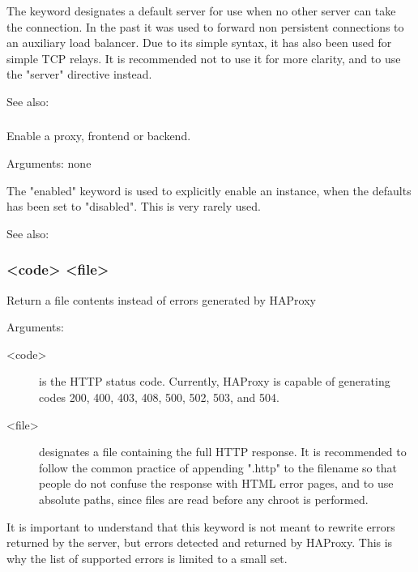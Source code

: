  The  keyword designates a default server for use when no other
  server can take the connection. In the past it was used to forward non
  persistent connections to an auxiliary load balancer. Due to its simple
  syntax, it has also been used for simple TCP relays. It is recommended not to
  use it for more clarity, and to use the "server" directive instead.

  See also: 

\subsubsection[enabled]{}
  Enable a proxy, frontend or backend.
  
  
  Arguments: none

  The "enabled" keyword is used to explicitly enable an instance, when the
  defaults has been set to "disabled". This is very rarely used.

  See also: 

\subsubsection[errorfile]{ <code> <file>}
  Return a file contents instead of errors generated by HAProxy
  

  Arguments:
  \begin{description}
  \item[<code>]    is the HTTP status code. Currently, HAProxy is capable of
              generating codes 200, 400, 403, 408, 500, 502, 503, and 504.

   \item[<file>]    designates a file containing the full HTTP response. It is
              recommended to follow the common practice of appending ".http" to
              the filename so that people do not confuse the response with HTML
              error pages, and to use absolute paths, since files are read
              before any chroot is performed.
  \end{description}

  It is important to understand that this keyword is not meant to rewrite
  errors returned by the server, but errors detected and returned by HAProxy.
  This is why the list of supported errors is limited to a small set.

